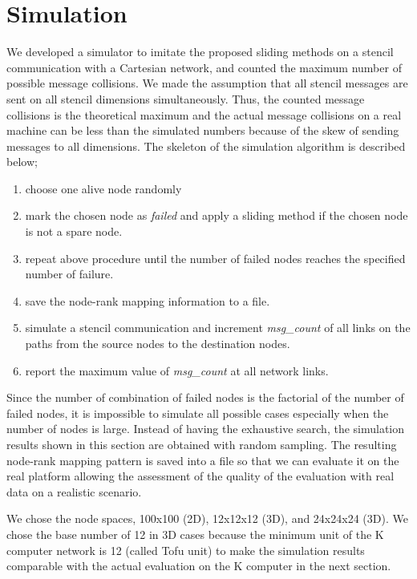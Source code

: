 \documentclass[Afour,times,sageh]{sagej}
\begin{document}
\section{Simulation}\label{sec:sim}

We developed a simulator to imitate the proposed sliding methods on a
stencil communication with a Cartesian network, and counted the maximum
number of possible message collisions. We made the assumption that all stencil
messages are sent on all stencil dimensions simultaneously. Thus, the
counted message collisions is the theoretical maximum and the actual
message collisions on a real machine can be less than the simulated
numbers because of the skew of sending messages to all dimensions. The
skeleton of the simulation algorithm is described below;

\begin{enumerate}
\item choose one alive node randomly
\item mark the chosen node as {\it failed} and apply a sliding
  method if the chosen node is not a spare node.
\item repeat above procedure until the number of failed nodes reaches
  the specified number of failure.
\item save the node-rank mapping information to a file.
\item simulate a stencil communication and increment {\it
    msg\_count} of all links on the paths from the source nodes to the
  destination nodes.
\item report the maximum value of {\it msg\_count} at all network links.
\end{enumerate}

Since the number of combination of failed nodes is the factorial of
the number of failed nodes, it is impossible to simulate all possible
cases especially when the number of nodes is large. Instead of having
the exhaustive search, the simulation results shown in this section
are obtained with random sampling. The resulting node-rank mapping
pattern is saved into a file so that we can evaluate it on
the real platform allowing the assessment of the quality of the evaluation
with real data on a realistic scenario.

We chose the node spaces, 100x100 (2D), 12x12x12 (3D), and 24x24x24
(3D). We chose the base number of 12 in 3D cases  because the minimum
unit of the K computer network is 12 (called Tofu unit) to make the
simulation results comparable with the actual evaluation on the K
computer in the next section.
\end{document}

